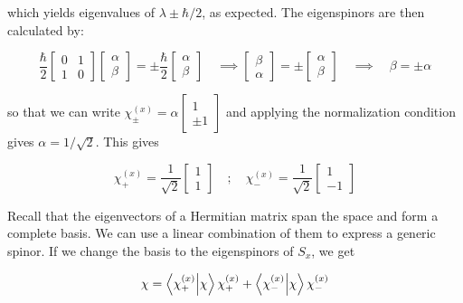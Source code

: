 \documentclass[12pt, titlepage]{article}
\begin{document}
which yields eigenvalues of $\lambda \pm\hbar/2$, as expected. The eigenspinors are then calculated by:

\begin{equation*}
	\frac{\hbar}{2}\begin{bmatrix}0 & 1 \\ 1 & 0 \end{bmatrix}\begin{bmatrix} \alpha \\ \beta \end{bmatrix} = \pm\frac{\hbar}{2}\begin{bmatrix} \alpha \\ \beta \end{bmatrix} \quad\implies \begin{bmatrix} \beta \\ \alpha \end{bmatrix} = \pm\begin{bmatrix} \alpha \\ \beta \end{bmatrix} \quad\implies\quad \beta = \pm\alpha
\end{equation*}

so that we can write $\chi_{\pm}^{(x)} = \alpha \begin{bmatrix} 1 \\ \pm 1\end{bmatrix}$ and applying the normalization condition gives $\alpha = 1/\sqrt{2}$. This gives

\begin{equation}
	\chi_+^{(x)} = \frac{1}{\sqrt{2}}\begin{bmatrix} 1 \\ 1\end{bmatrix} \quad;\quad \chi_-^{(x)} = \frac{1}{\sqrt{2}}\begin{bmatrix} 1 \\ -1\end{bmatrix}
\end{equation}

Recall that the eigenvectors of a Hermitian matrix span the space and form a complete basis. We can use a linear combination of them to express a generic spinor. If we change the basis to the eigenspinors of $S_x$, we get

\begin{equation}
	\chi = \bra{\chi_+^{(x)}}\ket{\chi}\chi_+^{(x)} + \bra{\chi_-^{(x)}}\ket{\chi}\chi_-^{(x)}
\end{equation}
\end{document}
